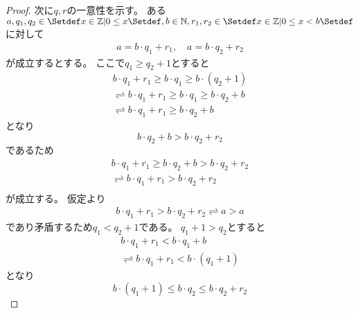 \documentclass[uplatex, 11pt, a4j, dvipdfmx]{jsarticle}
\begin{document}
\begin{proof}
    次に$q, r$の一意性を示す。
    ある$a, q_1, q_2 \in \Set{ x \in \Z | 0 \leq x }, b \in \N, r_1, r_2 \in \Set{ x \in \Z | 0 \leq x < b }$に対して
    \begin{equation}\begin{gathered}
      a = b \cdot q_1 + r_1, \quad a = b \cdot q_2 + r_2
    \end{gathered}\end{equation}
    が成立するとする。
    ここで$q_1 \geq q_2 + 1$とすると
    \begin{equation} \begin{aligned}
      b \cdot q_1 + r_1 \geq b \cdot q_1 \geq b \cdot (q_2 + 1) \\
      \rightleftharpoons b \cdot q_1 + r_1 \geq b \cdot q_1 \geq b \cdot q_2 + b \\
      \rightleftharpoons b \cdot q_1 + r_1 \geq b \cdot q_2 + b
    \end{aligned} \end{equation}
    となり
    \begin{equation}
      b \cdot q_2 + b > b \cdot q_2 + r_2
    \end{equation}
    であるため
    \begin{equation} \begin{aligned}
      b \cdot q_1 + r_1 \geq b \cdot q_2 + b > b \cdot q_2 + r_2 \\
      \rightleftharpoons b \cdot q_1 + r_1 > b \cdot q_2 + r_2 \\
    \end{aligned} \end{equation}
    が成立する。
    仮定より
    \begin{equation} \begin{aligned}
      b \cdot q_1 + r_1 > b \cdot q_2 + r_2 \rightleftharpoons a > a
    \end{aligned} \end{equation}
    であり矛盾するため$q_1 < q_2 + 1$である。
    $q_1 + 1 > q_2$とすると
    \begin{equation} \begin{aligned}
      b \cdot q_1 + r_1 < b \cdot q_1 + b \\
      \rightleftharpoons b \cdot q_1 + r_1 < b \cdot (q_1 + 1)
    \end{aligned} \end{equation}
    となり
    \begin{equation}
      b \cdot (q_1 + 1) \leq b \cdot q_2 \leq b \cdot q_2 + r_2
    \end{equation}

\end{proof}
\end{document}
